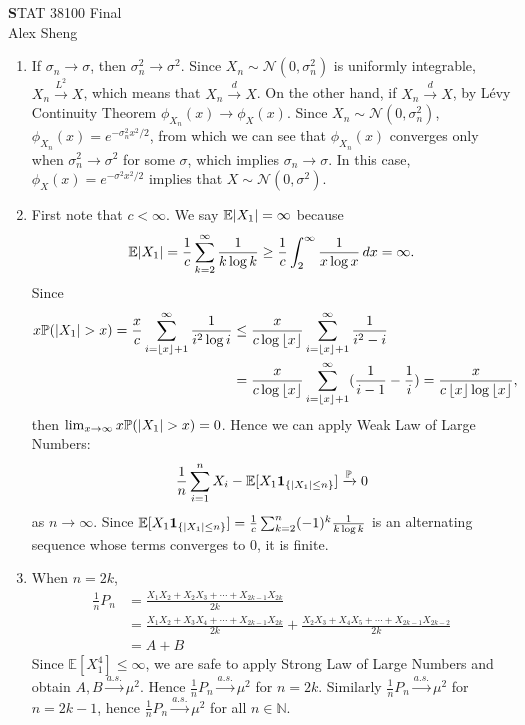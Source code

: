 \documentclass[11pt]{article}
\theoremstyle{definition}
\newcommand{\E}{\mathbb{E}}
\begin{document}
\begin{center}
{\Large\textbf STAT 38100 \hspace{0.1cm} Final}\\
\large{Alex Sheng}
\end{center}

\vspace{0.1 cm}

\begin{enumerate}

\item If $\sigma_n\to\sigma$, then $\sigma_n^2\to\sigma^2$. Since $X_n\sim\mathcal{N}(0,\sigma_n^2)$ is uniformly integrable, $X_n\xrightarrow{L^2}X$, which means that $X_n\xrightarrow{d}X$.\smallbreak
On the other hand, if $X_n\xrightarrow{d}X$, by Lévy Continuity Theorem $\phi_{X_n}(x)\to\phi_X(x)$. Since $X_n\sim\mathcal{N}(0,\sigma_n^2)$, $\phi_{X_n}(x)=e^{-\sigma_n^2x^2/2}$, from which we can see that $\phi_{X_n}(x)$ converges only when $\sigma_n^2\to\sigma^2$ for some $\sigma$, which implies $\sigma_n\to\sigma$. In this case, $\phi_X(x)=e^{-\sigma^2x^2/2}$ implies that $X\sim\mathcal{N}(0,\sigma^2)$.

\item First note that $c<\infty$. We say $\E\abs{X_1}=\infty$ because
\[\E\abs{X_1}=\frac{1}{c}\sum_{k=2}^\infty\frac{1}{k\log k}\geq\frac{1}{c}\int_2^\infty\frac{1}{x\log x}\,dx=\infty.\]
Since
\begin{align*}
x\mathbb{P}(\abs{X_1}>x)=\frac{x}{c}\sum_{i=\left\lfloor{x}\right\rfloor+1}^\infty\frac{1}{i^2\log i}&\leq\frac{x}{c\log\left\lfloor{x}\right\rfloor}\sum_{i=\left\lfloor{x}\right\rfloor+1}^\infty\frac{1}{i^2-i}\\
&=\frac{x}{c\log\left\lfloor{x}\right\rfloor}\sum_{i=\left\lfloor{x}\right\rfloor+1}^\infty(\frac{1}{i-1}-\frac{1}{i})=\frac{x}{c\left\lfloor{x}\right\rfloor\log\left\lfloor{x}\right\rfloor},
\end{align*}
then $\lim_{x\to\infty}x\mathbb{P}(\abs{X_1}>x)=0$. Hence we can apply Weak Law of Large Numbers:
\[\frac{1}{n}\sum_{i=1}^nX_i-\E[X_1\mathbf{1}_{\{\abs{X_1}\leq n\}}]\xrightarrow{\mathbb{P}}0\]
as $n\to\infty$. Since $\E[X_1\mathbf{1}_{\{\abs{X_1}\leq n\}}]=\frac{1}{c}\sum_{k=2}^n(-1)^k\frac{1}{k\log k}$ is an alternating sequence whose terms converges to 0, it is finite.

\item When $n=2k$,
\begin{align*}
\frac{1}{n}P_n&=\frac{X_1X_2+X_2X_3+\cdots+X_{2k-1}X_{2k}}{2k}\\
&=\frac{X_1X_2+X_3X_4+\cdots+X_{2k-1}X_{2k}}{2k}+\frac{X_2X_3+X_4X_5+\cdots+X_{2k-1}X_{2k-2}}{2k}\\
&=A+B
\end{align*}
Since $\E[X_1^4]\leq\infty$, we are safe to apply Strong Law of Large Numbers and obtain $A,B\xrightarrow{a.s.}\mu^2$. Hence $\frac{1}{n}P_n\xrightarrow{a.s.}\mu^2$ for $n=2k$. Similarly $\frac{1}{n}P_n\xrightarrow{a.s.}\mu^2$ for $n=2k-1$, hence $\frac{1}{n}P_n\xrightarrow{a.s.}\mu^2$ for all $n\in\mathbb{N}$.


\end{enumerate}
\end{document}
